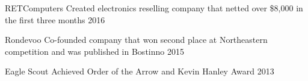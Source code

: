 

\begin{cvhonors}

  \cvhonor
    {RETComputers} %
    {Created electronics reselling company that netted over \$8,000 in the first three months} %
    {} %
    {2016} %

  \cvhonor
    {Rondevoo} %
    {Co-founded company that won second place at Northeastern competition and was published in Bostinno} %
    {} %
    {2015} %

  \cvhonor
    {Eagle Scout} %
    {Achieved Order of the Arrow and Kevin Hanley Award} %
    {} %
    {2013} %

\end{cvhonors}
